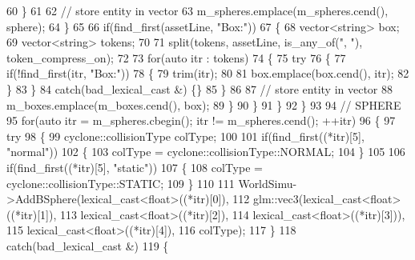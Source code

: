\begin{DoxyCode}
60                     \}
61 
62                     \textcolor{comment}{// store entity in vector}
63                     m\_spheres.emplace(m\_spheres.cend(), sphere);
64                 \}
65 
66                 \textcolor{keywordflow}{if}(find\_first(assetLine, \textcolor{stringliteral}{"Box:"}))
67                 \{
68                     vector<string> box;
69                     vector<string> tokens;
70 
71                     split(tokens, assetLine, is\_any\_of(\textcolor{stringliteral}{", "}), token\_compress\_on);
72 
73                     \textcolor{keywordflow}{for}(\textcolor{keyword}{auto} itr : tokens)
74                     \{
75                         \textcolor{keywordflow}{try}
76                         \{
77                             \textcolor{keywordflow}{if}(!find\_first(itr, \textcolor{stringliteral}{"Box:"}))
78                             \{
79                                 trim(itr);
80 
81                                 box.emplace(box.cend(), itr);
82                             \}
83                         \}
84                         \textcolor{keywordflow}{catch}(bad\_lexical\_cast &) \{\}
85                     \}
86 
87                     \textcolor{comment}{// store entity in vector}
88                     m\_boxes.emplace(m\_boxes.cend(), box);
89                 \}
90             \}
91         \}
92     \}
93 
94     \textcolor{comment}{// SPHERE}
95     \textcolor{keywordflow}{for}(\textcolor{keyword}{auto} itr = m\_spheres.cbegin(); itr != m\_spheres.cend(); ++itr)
96     \{
97         \textcolor{keywordflow}{try}
98         \{
99             cyclone::collisionType colType;
100 
101             \textcolor{keywordflow}{if}(find\_first((*itr)[5], \textcolor{stringliteral}{"normal"}))
102             \{
103                 colType = cyclone::collisionType::NORMAL;
104             \}
105 
106             \textcolor{keywordflow}{if}(find\_first((*itr)[5], \textcolor{stringliteral}{"static"}))
107             \{
108                 colType = cyclone::collisionType::STATIC;
109             \}
110 
111             WorldSimu->AddBSphere(lexical\_cast<float>((*itr)[0]),
112                                   glm::vec3(lexical\_cast<float>((*itr)[1]),
113                                             lexical\_cast<float>((*itr)[2]),
114                                             lexical\_cast<float>((*itr)[3])),
115                                   lexical\_cast<float>((*itr)[4]),
116                                   colType);
117         \}
118         \textcolor{keywordflow}{catch}(bad\_lexical\_cast &)
119         \{

\end{DoxyCode}
